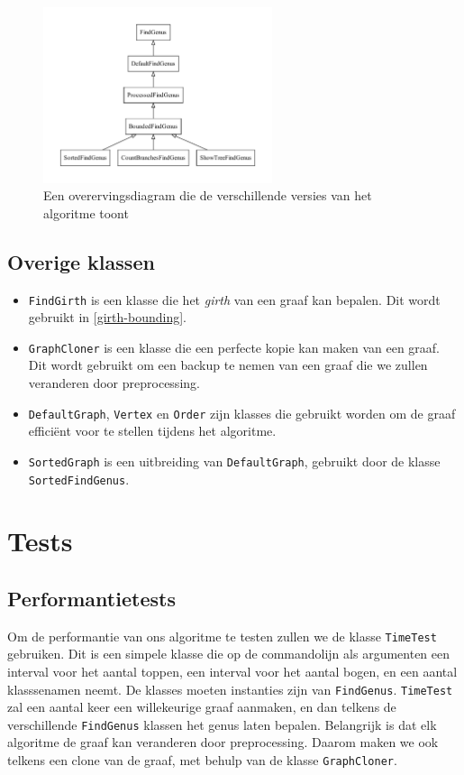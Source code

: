 \documentclass{article}
\begin{document}
\begin{figure}
\begin{center}
\includegraphics[width=0.6\textwidth]{images/inheritance.pdf}
\caption{Een overervingsdiagram die de verschillende versies van het algoritme
toont}
\label{fig:inheritance}
\end{center}
\end{figure}

\subsection{Overige klassen}
\begin{itemize}
\item \verb#FindGirth# is een klasse die het \emph{girth} van een graaf kan
bepalen. Dit wordt gebruikt in \ref{girth-bounding}.
\item \verb#GraphCloner# is een klasse die een perfecte kopie kan maken van
een graaf. Dit wordt gebruikt om een backup te nemen van een graaf die we
zullen veranderen door preprocessing.
\item \verb#DefaultGraph#, \verb#Vertex# en \verb#Order# zijn klasses die
gebruikt worden om de graaf effici\"ent voor te stellen tijdens het algoritme.
\item \verb#SortedGraph# is een uitbreiding van \verb#DefaultGraph#, gebruikt
door de klasse \verb#SortedFindGenus#.
\end{itemize}

\section{Tests}

\subsection{Performantietests}
Om de performantie van ons algoritme te testen zullen we de klasse
\verb#TimeTest# gebruiken. Dit is een simpele klasse die op de commandolijn als
argumenten een interval voor het aantal toppen, een interval voor het aantal
bogen, en een aantal klasssenamen neemt. De klasses moeten instanties zijn van
\verb#FindGenus#. \verb#TimeTest# zal een aantal keer een willekeurige graaf
aanmaken, en dan telkens de verschillende \verb#FindGenus# klassen het genus
laten bepalen. Belangrijk is dat elk algoritme de graaf kan veranderen door
preprocessing. Daarom maken we ook telkens een clone van de graaf, met behulp
van de klasse \verb#GraphCloner#.
\newline
\end{document}

